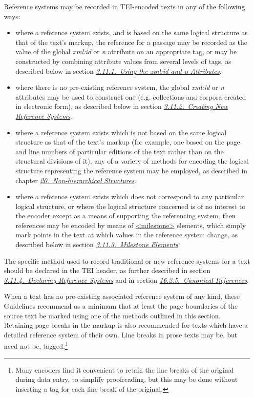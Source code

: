 Reference systems may be recorded in TEI-encoded texts in any of the following ways: \begin{itemize}
\item where a reference system exists, and is based on the same logical structure as that of the text's markup, the reference for a passage may be recorded as the value of the global {\itshape xml:id} or {\itshape n} attribute on an appropriate tag, or may be constructed by combining attribute values from several levels of tags, as described below in section \textit{\hyperref[CORS1]{3.11.1.\ Using the xml:id and n Attributes}}.
\item where there is no pre-existing reference system, the global {\itshape xml:id} or {\itshape n} attributes may be used to construct one (e.g. collections and corpora created in electronic form), as described below in section \textit{\hyperref[CORS2]{3.11.2.\ Creating New Reference Systems}}.
\item where a reference system exists which is not based on the same logical structure as that of the text's markup (for example, one based on the page and line numbers of particular editions of the text rather than on the structural divisions of it), any of a variety of methods for encoding the logical structure representing the reference system may be employed, as described in chapter \textit{\hyperref[NH]{20.\ Non-hierarchical Structures}}.
\item where a reference system exists which does not correspond to any particular logical structure, or where the logical structure concerned is of no interest to the encoder except as a means of supporting the referencing system, then references may be encoded by means of \hyperref[TEI.milestone]{<milestone>} elements, which simply mark points in the text at which values in the reference system change, as described below in section \textit{\hyperref[CORS5]{3.11.3.\ Milestone Elements}}.
\end{itemize}  The specific method used to record traditional or new reference systems for a text should be declared in the TEI header, as further described in section \textit{\hyperref[CORS6]{3.11.4.\ Declaring Reference Systems}} and in section \textit{\hyperref[SACR]{16.2.5.\ Canonical References}}.\par
When a text has no pre-existing associated reference system of any kind, these Guidelines recommend as a minimum that at least the page boundaries of the source text be marked using one of the methods outlined in this section. Retaining page breaks in the markup is also recommended for texts which have a detailed reference system of their own. Line breaks in prose texts may be, but need not be, tagged.\footnote{Many encoders find it convenient to retain the line breaks of the original during data entry, to simplify proofreading, but this may be done without inserting a tag for each line break of the original.}
